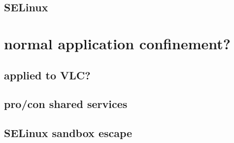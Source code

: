 
\subsection{SELinux}

\section{normal application confinement?}


\subsection{applied to VLC?}



\subsection{pro/con shared services}



\subsection{SELinux sandbox escape}


%
